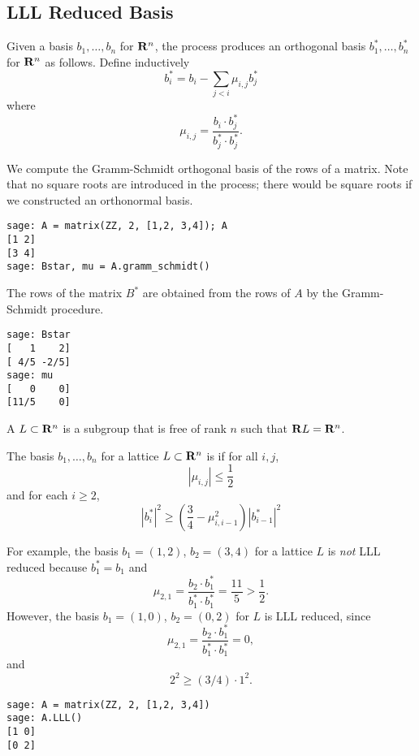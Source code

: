\subsection{LLL Reduced Basis}
Given a basis $b_1,\ldots, b_n$ for $\mathbf{R}^n$, the  process produces an orthogonal basis 
$b_1^*,\ldots, b_n^*$ for $\mathbf{R}^n$ as follows.  Define inductively
$$
   b_i^* = b_i - \sum_{j < i} \mu_{i,j} b_j^*
$$
where
$$
\mu_{i,j} = \frac{b_i \cdot b_j^*}{b_j^* \cdot b_j^*}.
$$

\begin{example}
We compute the Gramm-Schmidt orthogonal basis of the rows
of a matrix.  Note that no square roots are introduced
in the process; there would be square roots if we
constructed an orthonormal basis. 
\begin{verbatim}
sage: A = matrix(ZZ, 2, [1,2, 3,4]); A
[1 2]
[3 4]
sage: Bstar, mu = A.gramm_schmidt()
\end{verbatim}%

\noindent{}The rows of the matrix $B^*$ are obtained
from the rows of $A$ by the Gramm-Schmidt procedure. 
\begin{verbatim}
sage: Bstar
[   1    2]
[ 4/5 -2/5]
sage: mu
[   0    0]
[11/5    0]
\end{verbatim}
\end{example}

A  $L\subset \mathbf{R}^n$ is a subgroup that
is free of rank $n$ such that $\mathbf{R} L = \mathbf{R}^n$. 

\begin{definition}
The basis $b_1,\ldots, b_n$ for a lattice $L\subset \mathbf{R}^n$
is  if for all $i,j$, 
$$
   |\mu_{i,j}| \leq \frac{1}{2}
$$   
and for each $i\geq 2$, 
$$
  |b_i^*|^2 \geq \left( \frac{3}{4} - \mu_{i,i-1}^2\right) | b_{i-1}^*|^2
$$

\end{definition}

For example, the basis $b_1 = (1,2)$, $b_2 = (3,4)$ for a lattice $L$
 is {\em not}
LLL reduced because $b_1^*=b_1$ and 
$$
   \mu_{2,1} = \frac{b_2 \cdot b_1^*}{b_1^* \cdot b_1^*}
       = \frac{11}{5} > \frac{1}{2}.
$$
However, the basis $b_1 = (1,0)$, $b_2 = (0,2)$ for $L$ is
LLL reduced, since
$$
 \mu_{2,1} = \frac{b_2 \cdot b_1^*}{b_1^* \cdot b_1^*}
       = 0,
$$
and
$$
   2^2 \geq (3/4) \cdot 1^2.
$$
\begin{verbatim}
sage: A = matrix(ZZ, 2, [1,2, 3,4])
sage: A.LLL()
[1 0]
[0 2]
\end{verbatim}

